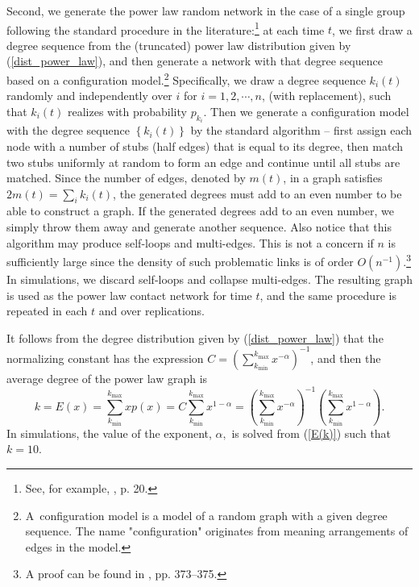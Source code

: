 \documentclass[12pt]{article}
\begin{document}
Second, we generate the power law random network in the case of a single group
following the standard procedure in the literature:\footnote{See, for example,
\cite{Kiss2017book}, p. 20.} at each time $t$, we first draw a degree sequence
from the (truncated) power law distribution given by (\ref{dist_power_law}),
and then generate a network with that degree sequence based on a configuration
model.\footnote{A\ configuration model is a model of a random graph with a
given degree sequence. The name "configuration" originates from
\cite{Bollobas1980configuration} meaning arrangements of edges in the model.}
Specifically, we draw a degree sequence $k_{i}\left(  t\right)  $ randomly and
independently over $i$ for $i=1,2,\cdots,n$, (with replacement), such that
$k_{i}\left(  t\right)  $ realizes with probability $p_{k_{i}}$. Then we
generate a configuration model with the degree sequence $\left\{  k_{i}\left(
t\right)  \right\}  $ by the standard algorithm -- first assign each node with
a number of stubs (half edges) that is equal to its degree, then match two
stubs uniformly at random to form an edge and continue until all stubs are
matched. Since the number of edges, denoted by $m\left(  t\right)  $, in a
graph satisfies $2m\left(  t\right)  =\sum_{i}k_{i}\left(  t\right)  $, the
generated degrees must add to an even number to be able to construct a graph.
If the generated degrees add to an even number, we simply throw them away and
generate another sequence. Also notice that this algorithm may produce
self-loops and multi-edges. This is not a concern if $n$ is sufficiently large
since the density of such problematic links is of order $O(n^{-1}%
).$\footnote{A proof can be found in \cite{Newman2018book}, pp. 373--375.} In
simulations, we discard self-loops and collapse multi-edges. The resulting
graph is used as the power law contact network for time $t$, and the same
procedure is repeated in each $t$ and over replications.

It follows from the degree distribution given by (\ref{dist_power_law}) that
the normalizing constant has the expression $C=\left(  \sum_{k_{\min}%
}^{k_{\max}}x^{-\alpha}\right)  ^{-1}$, and then the average degree of the
power law graph is%
\begin{equation}
k=E\left(  x\right)  =\sum_{k_{\min}}^{k_{\max}}xp\left(  x\right)
=C\sum_{k_{\min}}^{k_{\max}}x^{1-\alpha}=\left(  \sum_{k_{\min}}^{k_{\max}%
}x^{-\alpha}\right)  ^{-1}\left(  \sum_{k_{\min}}^{k_{\max}}x^{1-\alpha
}\right)  .\label{E(k)}%
\end{equation}
In simulations, the value of the exponent, $\alpha,$ is solved from
(\ref{E(k)}) such that $k=10$.
\end{document}

